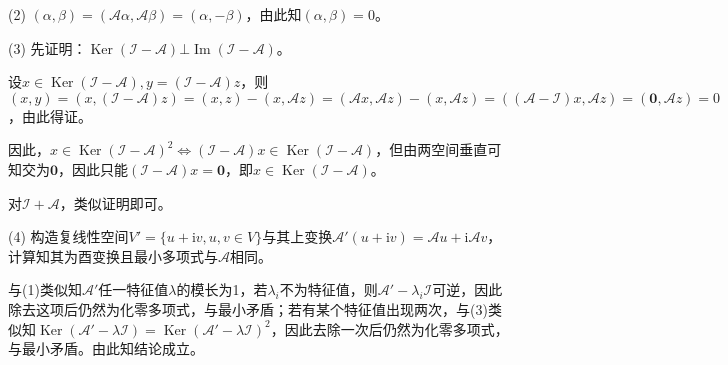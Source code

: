 \documentclass[a4paper,UTF8,fontset=windows]{ctexart}
\DeclareMathOperator{\im}{Im}
\DeclareMathOperator{\Ker}{Ker}
\begin{document}
\begin{enumerate}
(2) $(\alpha,\beta)=(\mathcal{A}\alpha,\mathcal{A}\beta)=(\alpha,-\beta)$，由此知$(\alpha,\beta)=0$。

(3) 先证明：$\Ker(\mathcal{I}-\mathcal{A})\bot\im(\mathcal{I}-\mathcal{A})$。

设$x\in\Ker(\mathcal{I}-\mathcal{A}),y=(\mathcal{I}-\mathcal{A})z$，则$(x,y)=(x,(\mathcal{I}-\mathcal{A})z)=(x,z)-(x,\mathcal{A}z)=(\mathcal{A}x,\mathcal{A}z)-(x,\mathcal{A}z)=((\mathcal{A}-\mathcal{I})x,\mathcal{A}z)=(\mathbf{0},\mathcal{A}z)=0$，由此得证。

因此，$x\in\Ker(\mathcal{I}-\mathcal{A})^2\Leftrightarrow(\mathcal{I}-\mathcal{A})x\in\Ker(\mathcal{I}-\mathcal{A})$，但由两空间垂直可知交为$\mathbf{0}$，因此只能$(\mathcal{I}-\mathcal{A})x=\mathbf{0}$，即$x\in\Ker(\mathcal{I}-\mathcal{A})$。

对$\mathcal{I}+\mathcal{A}$，类似证明即可。

(4) 构造复线性空间$V'=\{u+\mathrm{i}v,u,v\in V\}$与其上变换$\mathcal{A}'(u+\mathrm{i}v)=\mathcal{A}u+\mathrm{i}\mathcal{A}v$，计算知其为酉变换且最小多项式与$\mathcal{A}$相同。

与(1)类似知$\mathcal{A}'$任一特征值$\lambda$的模长为1，若$\lambda_i$不为特征值，则$\mathcal{A}'-\lambda_i\mathcal{I}$可逆，因此除去这项后仍然为化零多项式，与最小矛盾；若有某个特征值出现两次，与(3)类似知$\Ker(\mathcal{A}'-\lambda\mathcal{I})=\Ker(\mathcal{A}'-\lambda\mathcal{I})^2$，因此去除一次后仍然为化零多项式，与最小矛盾。由此知结论成立。
\end{enumerate}
\end{document}
